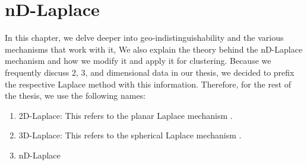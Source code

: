 \chapter{nD-Laplace}
In this chapter, we delve deeper into geo-indistinguishability and the various mechanisms that work with it, 
We also explain the theory behind the nD-Laplace mechanism and how we modify it and apply it for clustering.
Because we frequently discuss 2, 3, and dimensional data in our thesis, we decided to prefix the respective Laplace method with this information.
Therefore, for the rest of the thesis, we use the following names:
\begin{enumerate}
  \item 2D-Laplace: This refers to the planar Laplace mechanism \citep{DBLP:journals/corr/abs-1212-1984}.
  \item 3D-Laplace: This refers to the spherical Laplace mechanism \citep{9646489}.
  \item nD-Laplace
\end{enumerate}

\printnomenclature



\newpage
